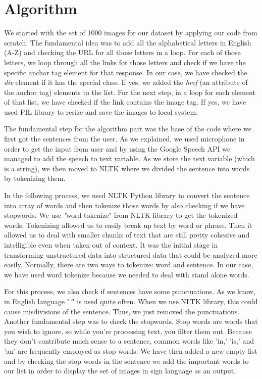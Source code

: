 \documentclass[twocolumn,10pt]{asme2ej}
\begin{document}
\section{Algorithm}

We started with the set of 1000 images for our dataset by applying our code from scratch. The fundamental idea was to add all the alphabetical letters in English (A-Z) and checking the URL for all those letters in a loop. For each of those letters, we loop through all the links for those letters and check if we have the specific anchor tag element for that response. In our case, we have checked the \textit{div} element if it has the special class. If yes, we added the \textit{href} (an attribute of the anchor tag) elements to the list. For the next step, in a loop for each element of that list, we have checked if the link contains the image tag. If yes, we have used PIL library to resize and save the images to local system. 

The fundamental step for the algorithm part was the base of the code where we first got the sentences from the user. As we explained, we used microphone in order to get the input from user and by using the Google Speech API we managed to add the speech to text variable. As we store the text variable (which is a string), we then moved to NLTK where we divided the sentence into words by tokenizing them. 

In the following process, we used NLTK Python library to convert the sentence into array of words and then tokenize those words by also checking if we have stopwords. We use {\emph "word tokenize"} from NLTK library to get the tokenized words. Tokenizing allowed us to easily break up text by word or phrase. Then it allowed us to deal with smaller chunks of text that are still pretty cohesive and intelligible even when taken out of context. It was the initial stage in transforming unstructured data into structured data that could be analyzed more easily. Normally, there are two ways to tokenize: word and sentence. In our case, we have used word tokenize because we needed to deal with stand alone words. 

For this process, we also check if sentences have some punctuations. As we know, in English language "{\emph '}" is used quite often. When we use NLTK library, this could cause misdivisions of the sentence. Thus, we just removed the punctuations. Another fundamental step was to check the stopwords. Stop words are words that you wish to ignore, so while you're processing text, you filter them out. Because they don't contribute much sense to a sentence, common words like 'in,' 'is,' and 'an' are frequently employed as stop words. We have then added a new empty list and by checking the stop words in the sentence we add the important words to our list in order to display the set of images in sign language as an output. 
\end{document}
